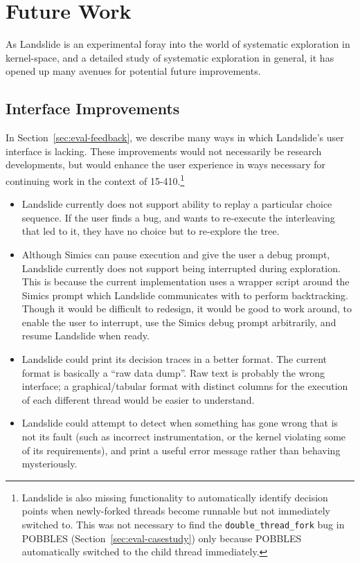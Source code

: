 \chapter{Future Work}
\label{sec:future}

As Landslide is an experimental foray into the world of systematic exploration in kernel-space, and a detailed study of systematic exploration in general, it has opened up many avenues for potential future improvements.

\section{Interface Improvements}
\label{sec:future-interface}

In Section~\ref{sec:eval-feedback}, we describe many ways in which Landslide's user interface is lacking. These improvements would not necessarily be research developments, but would enhance the user experience in ways necessary for continuing work in the context of 15-410.\footnote{
Landslide is also missing functionality to automatically identify decision points when newly-forked threads become runnable but not immediately switched to. This was not necessary to find the \texttt{double\_thread\_fork} bug in POBBLES (Section~\ref{sec:eval-casestudy}) only because POBBLES automatically switched to the child thread immediately.}

\begin{itemize}
	\item Landslide currently does not support ability to replay a particular choice sequence. If the user finds a bug, and wants to re-execute the interleaving that led to it, they have no choice but to re-explore the tree.
	\item Although Simics can pause execution and give the user a debug prompt, Landslide currently does not support being interrupted during exploration.
		This is because the current implementation uses a wrapper script around the Simics prompt which Landslide communicates with to perform backtracking.
		Though it would be difficult to redesign, it would be good to work around, to enable the user to interrupt, use the Simics debug prompt arbitrarily, and resume Landslide when ready.
	\item Landslide could print its decision traces in a better format. The current format is basically a ``raw data dump''. Raw text is probably the wrong interface; a graphical/tabular format with distinct columns for the execution of each different thread would be easier to understand.
	\item Landslide could attempt to detect when something has gone wrong that is not its fault (such as incorrect instrumentation, or the kernel violating some of its requirements), and print a useful error message rather than behaving mysteriously.
\end{itemize}

